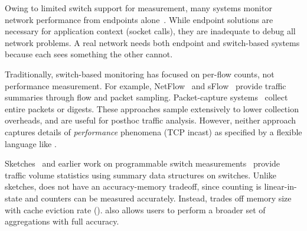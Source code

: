 
 Owing to limited switch support for
measurement, many systems monitor network performance from endpoints
alone~\cite{netpoirot, minlan-snap, dapper-sosr, trumpet, azure-smartnic}.
While endpoint solutions are necessary for application context (\eg socket
calls), they are inadequate to debug all network problems. A real network needs
both endpoint and switch-based systems because each sees something the other
cannot.

 Traditionally, switch-based monitoring has
focused on per-flow counts, not performance measurement. For example,
NetFlow~\cite{netflow} and sFlow~\cite{sflow} provide traffic summaries
through flow and packet sampling. Packet-capture systems~\cite{cisco-span,
niksun, netsight, everflow, pathdump, path_query} collect entire packets or
digests. These approaches sample extensively to lower collection
overheads, and are useful for posthoc traffic analysis. However, neither
approach captures details of {\em performance} phenomena (\eg TCP incast) as
specified by a flexible language like \TheSystem.

 Sketches~\cite{univmon, flowradar, counterbraids, dream} and
earlier work on programmable switch measurements~\cite{progme, opensketch}
provide traffic volume statistics using summary data structures on switches.
Unlike sketches, \TheSystem does not have an accuracy-memory tradeoff, since
counting is linear-in-state and counters can be measured accurately. Instead,
\TheSystem trades off memory size with cache eviction rate ().
\TheSystem also allows users to perform a broader set of aggregations with full
accuracy.

